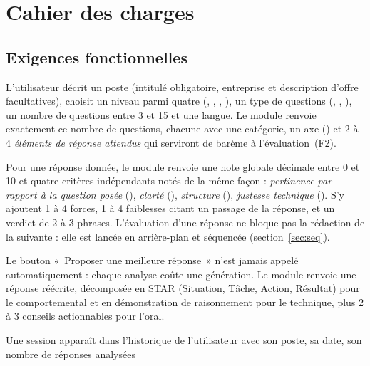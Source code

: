 \section{Cahier des charges}

\subsection{Exigences fonctionnelles}

\begin{description}[leftmargin=1.4em,itemsep=3pt,topsep=3pt,style=nextline]
  \item[F1 --- Génération de questions adaptées au poste.] L'utilisateur décrit
    un poste (intitulé obligatoire, entreprise et description d'offre
    facultatives), choisit un niveau parmi quatre (,
    , , ), un type de questions
    (, , ), un nombre de questions
    entre 3 et 15 et une langue. Le module renvoie exactement ce nombre de
    questions, chacune avec une catégorie, un axe () et 2 à 4
    \emph{éléments de réponse attendus} qui serviront de barème à
    l'évaluation~(F2).
  \item[F2 --- Évaluation notée sur 10.] Pour une réponse donnée, le module
    renvoie une note globale décimale entre 0 et 10 et quatre critères
    indépendants notés de la même façon : \emph{pertinence par rapport à la
    question posée} (), \emph{clarté} (),
    \emph{structure} (), \emph{justesse technique}
    (). S'y ajoutent 1 à 4 forces, 1 à 4 faiblesses
    citant un passage de la réponse, et un verdict de 2 à 3 phrases.
    L'évaluation d'une réponse ne bloque pas la rédaction de la suivante : elle
    est lancée en arrière-plan et séquencée (section~\ref{sec:seq}).
  \item[F3 --- Réponse améliorée, à la demande.] Le bouton
    «~Proposer une meilleure réponse~» n'est jamais appelé automatiquement :
    chaque analyse coûte une génération. Le module renvoie une réponse réécrite,
    décomposée en STAR (Situation, Tâche, Action, Résultat) pour le
    comportemental et en démonstration de raisonnement pour le technique, plus
    2 à 3 conseils actionnables pour l'oral.
  \item[F4 --- Historique et synthèse.] Une session apparaît dans l'historique
    de l'utilisateur avec son poste, sa date, son nombre de réponses analysées

\end{description}
